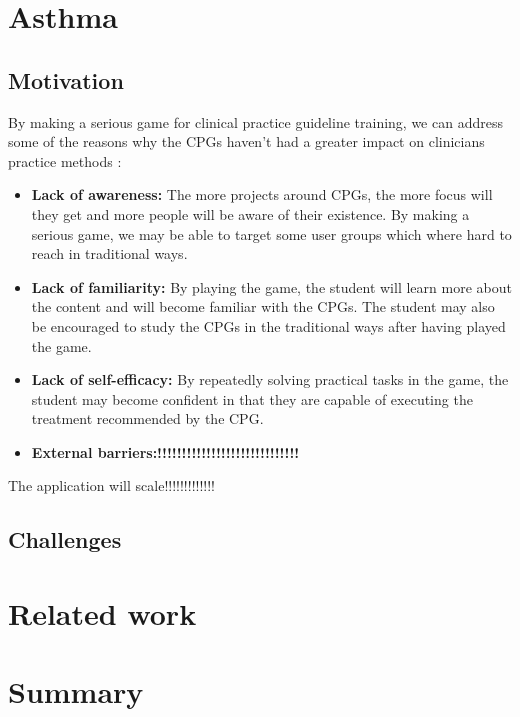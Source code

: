 \section{Asthma}
\subsection{Motivation}
By making a serious game for clinical practice guideline training, we can address some of the reasons why the CPGs haven't had a greater impact on clinicians practice methods \parencite{Cabana1999}:
\begin{itemize}
	\item \textbf{Lack of awareness:} The more projects around CPGs, the more focus will they get and more people will be aware of their existence. By making a serious game, we may be able to target some user groups which where hard to reach in traditional ways. 
	\item \textbf{Lack of familiarity:} By playing the game, the student will learn more about the content and will become familiar with the CPGs. The student may also be encouraged to study the CPGs in the traditional ways after having played the game.  
	\item \textbf{Lack of self-efficacy:} By repeatedly solving practical tasks in the game, the student may become confident in that they are capable of executing the treatment recommended by the CPG.
	\item \textbf{External barriers:!!!!!!!!!!!!!!!!!!!!!!!!!!!!!} 
\end{itemize}

The application will scale!!!!!!!!!!!!!
\subsection{Challenges}
\section{Related work}
\section{Summary}